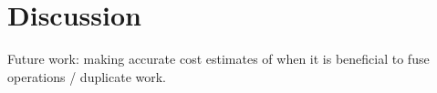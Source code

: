 %
%
%
%
%
%
%
%
\section{Discussion}

Future work: making accurate cost estimates of when it is beneficial to fuse
operations / duplicate work.


%
%
%
%

